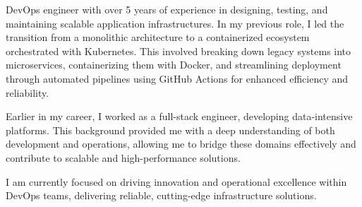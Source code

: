 \noindent DevOps engineer with over 5 years of experience in designing, testing, and maintaining scalable application infrastructures. In my previous role, I led the transition from a monolithic architecture to a containerized ecosystem orchestrated with Kubernetes. This involved breaking down legacy systems into microservices, containerizing them with Docker, and streamlining deployment through automated pipelines using GitHub Actions for enhanced efficiency and reliability.

\vspace{1em}

\noindent Earlier in my career, I worked as a full-stack engineer, developing data-intensive platforms. This background provided me with a deep understanding of both development and operations, allowing me to bridge these domains effectively and contribute to scalable and high-performance solutions.

\vspace{1em}

\noindent I am currently focused on driving innovation and operational excellence within DevOps teams, delivering reliable, cutting-edge infrastructure solutions.